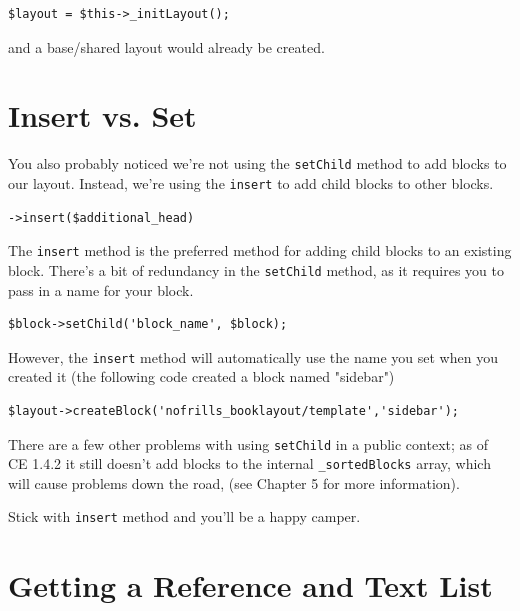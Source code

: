 \documentclass[oneside]{book}
\begin{document}
\begin{lstlisting}
$layout = $this->_initLayout();

\end{lstlisting}


and a base/shared layout would already be created.

\section{Insert vs. Set}

You also probably noticed we're not using the \footnotesize\texttt{setChild} \normalsize  method to add blocks to our layout.  Instead, we're using the \footnotesize\texttt{insert} \normalsize  to add child blocks to other blocks.

\begin{lstlisting}
->insert($additional_head)

\end{lstlisting}


The \footnotesize\texttt{insert} \normalsize  method is the preferred method for adding child blocks to an existing block.    There's a bit of redundancy in the \footnotesize\texttt{setChild} \normalsize  method, as it requires you to pass in a name for your block.

\begin{lstlisting}
$block->setChild('block_name', $block);

\end{lstlisting}


However, the \footnotesize\texttt{insert} \normalsize  method will automatically use the name you set when you created it (the following code created a block named "sidebar")

\begin{lstlisting}
$layout->createBlock('nofrills_booklayout/template','sidebar');

\end{lstlisting}


There are a few other problems with using \footnotesize\texttt{setChild} \normalsize  in a public context; as of CE 1.4.2 it still doesn't add blocks to the internal \footnotesize\texttt{\_sortedBlocks} \normalsize  array, which will cause problems down the road, (see Chapter 5 for more information).

Stick with \footnotesize\texttt{insert} \normalsize  method and you'll be a happy camper.

\section{Getting a Reference and Text List}
\end{document}
